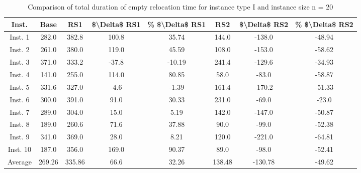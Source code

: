 \begin{table}[H]
\centering
\begin{tabular}{cccccccc}
  \hline
  \textbf{Inst.} & \textbf{Base} & \textbf{RS1} & \textbf{\$\textbackslash{}Delta\$  RS1} & \textbf{\% \$\textbackslash{}Delta\$  RS1} & \textbf{RS2} & \textbf{\$\textbackslash{}Delta\$  RS2} & \textbf{\% \$\textbackslash{}Delta\$  RS2} \\\hline
  Inst. 1 & 282.0 & 382.8 & 100.8 & 35.74 & 144.0 & -138.0 & -48.94 \\
  Inst. 2 & 261.0 & 380.0 & 119.0 & 45.59 & 108.0 & -153.0 & -58.62 \\
  Inst. 3 & 371.0 & 333.2 & -37.8 & -10.19 & 241.4 & -129.6 & -34.93 \\
  Inst. 4 & 141.0 & 255.0 & 114.0 & 80.85 & 58.0 & -83.0 & -58.87 \\
  Inst. 5 & 331.6 & 327.0 & -4.6 & -1.39 & 161.4 & -170.2 & -51.33 \\
  Inst. 6 & 300.0 & 391.0 & 91.0 & 30.33 & 231.0 & -69.0 & -23.0 \\
  Inst. 7 & 289.0 & 304.0 & 15.0 & 5.19 & 142.0 & -147.0 & -50.87 \\
  Inst. 8 & 189.0 & 260.6 & 71.6 & 37.88 & 90.0 & -99.0 & -52.38 \\
  Inst. 9 & 341.0 & 369.0 & 28.0 & 8.21 & 120.0 & -221.0 & -64.81 \\
  Inst. 10 & 187.0 & 356.0 & 169.0 & 90.37 & 89.0 & -98.0 & -52.41 \\
  Average & 269.26 & 335.86 & 66.6 & 32.26 & 138.48 & -130.78 & -49.62 \\\hline
\end{tabular}
\caption{Comparison of total duration of empty relocation time for instance type I and instance size n = 20}
\label{tab:wait:resrelocation-empty-relocation-comparison_I_20}
\end{table}
